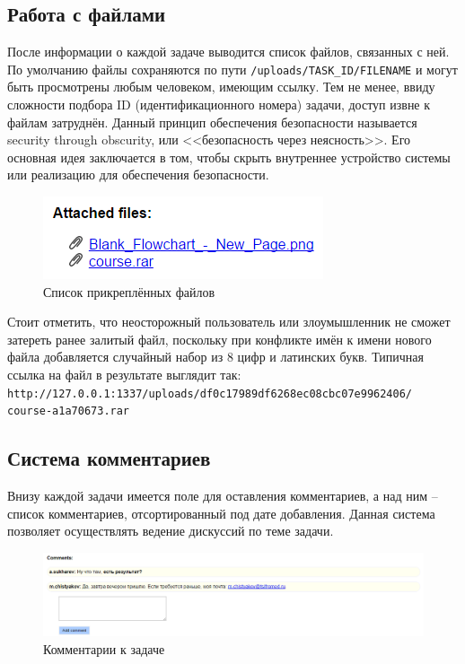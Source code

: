 \documentclass[a4paper, 14pt]{extarticle}
\begin{document}
\subsection{Работа с файлами}

После информации о каждой задаче выводится список файлов, связанных с ней. По умолчанию файлы сохраняются по пути {\tt /uploads/TASK\_ID/FILENAME} и могут быть просмотрены любым человеком, имеющим ссылку. Тем не менее, ввиду сложности подбора ID (идентификационного номера) задачи, доступ извне к файлам затруднён. Данный принцип обеспечения безопасности называется security through obscurity, или <<безопасность через неясность>>. Его основная идея заключается в том, чтобы скрыть внутреннее устройство системы или реализацию для обеспечения безопасности.

\begin{figure}[!htb]
  \centering
    \includegraphics[scale=0.75]{../shared_images/frontend/files.png}
   \caption{Список прикреплённых файлов}
    \label{fig:start}
\end{figure}

Стоит отметить, что неосторожный пользователь или злоумышленник не сможет затереть ранее залитый файл, поскольку при конфликте имён к имени нового файла добавляется случайный набор из 8 цифр и латинских букв. Типичная ссылка на файл в результате выглядит так: \\
{\tt http://127.0.0.1:1337/uploads/df0c17989df6268ec08cbc07e9962406/ \\
course-a1a70673.rar}

\subsection{Система комментариев}

Внизу каждой задачи имеется поле для оставления комментариев, а над ним -- список комментариев, отсортированный под дате добавления. Данная система позволяет осуществлять ведение дискуссий по теме задачи.

\begin{figure}[!htb]
  \centering
    \includegraphics[scale=0.6]{../shared_images/frontend/comments.png}
   \caption{Комментарии к задаче}
    \label{fig:start}
\end{figure}
\end{document}
